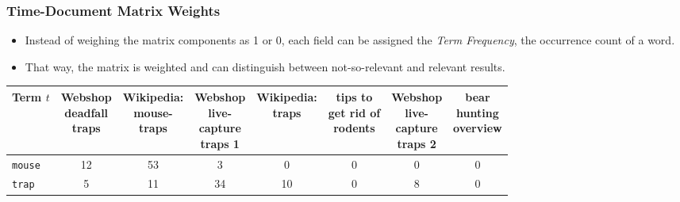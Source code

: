 			\subsubsection{Time-Document Matrix Weights} %
				\begin{itemize}
					\item Instead of weighing the matrix components as 1 or 0, each field can be assigned the \textit{Term Frequency}, the occurrence count of a word.
					\item That way, the matrix is weighted and can distinguish between not-so-relevant and relevant results.
				\end{itemize}
				\begin{table}[H]
					\centering
					\begin{tabular}{|l|c|c|c|c|c|c|c|}
						\hline
						\textbf{Term} \(t\) & \makecell{Webshop \\ deadfall \\ traps} & \makecell{Wikipedia: \\ mouse- \\ traps} & \makecell{Webshop \\ live- \\ capture \\ traps 1} & \makecell{Wikipedia: \\ traps} & \makecell{tips to \\ get rid of \\ rodents} & \makecell{Webshop \\ live- \\ capture \\ traps 2} & \makecell{bear \\ hunting \\ overview} \\ \hline
						\texttt{mouse}      & 12                                      & 53                                       & 3                                                 & \textcolor{irl}{0}             & \textcolor{irl}{0}                          & \textcolor{irl}{0}                                & \textcolor{irl}{0}                     \\ \hline
						\texttt{trap}       & 5                                       & 11                                       & 34                                                & 10                             & \textcolor{irl}{0}                          & 8                                                 & \textcolor{irl}{0}                     \\ \hline

\end{tabular}
\end{table}
